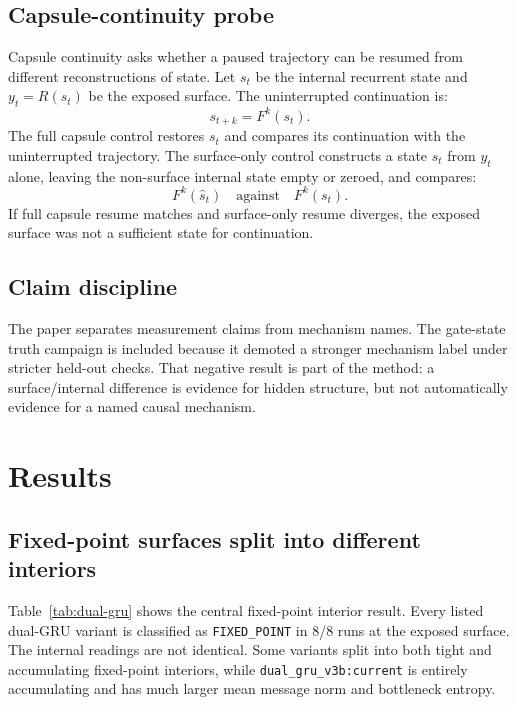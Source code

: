 \documentclass[11pt]{article}
\begin{document}
\subsection{Capsule-continuity probe}

Capsule continuity asks whether a paused trajectory can be resumed from
different reconstructions of state. Let $s_t$ be the internal recurrent state
and $y_t = R(s_t)$ be the exposed surface. The uninterrupted continuation is:
\[
  s_{t+k} = F^k(s_t).
\]
The full capsule control restores $s_t$ and compares its continuation with the
uninterrupted trajectory. The surface-only control constructs a state
$\hat{s}_t$ from $y_t$ alone, leaving the non-surface internal state empty or
zeroed, and compares:
\[
  F^k(\hat{s}_t) \quad \textrm{against} \quad F^k(s_t).
\]
If full capsule resume matches and surface-only resume diverges, the exposed
surface was not a sufficient state for continuation.

\subsection{Claim discipline}

The paper separates measurement claims from mechanism names. The gate-state
truth campaign is included because it demoted a stronger mechanism label under
stricter held-out checks. That negative result is part of the method: a
surface/internal difference is evidence for hidden structure, but not
automatically evidence for a named causal mechanism.

\section{Results}

\subsection{Fixed-point surfaces split into different interiors}

Table~\ref{tab:dual-gru} shows the central fixed-point interior result. Every
listed dual-GRU variant is classified as \texttt{FIXED\_POINT} in 8/8 runs at
the exposed surface. The internal readings are not identical. Some variants
split into both tight and accumulating fixed-point interiors, while
\texttt{dual\_gru\_v3b:current} is entirely accumulating and has much larger
mean message norm and bottleneck entropy.
\end{document}
